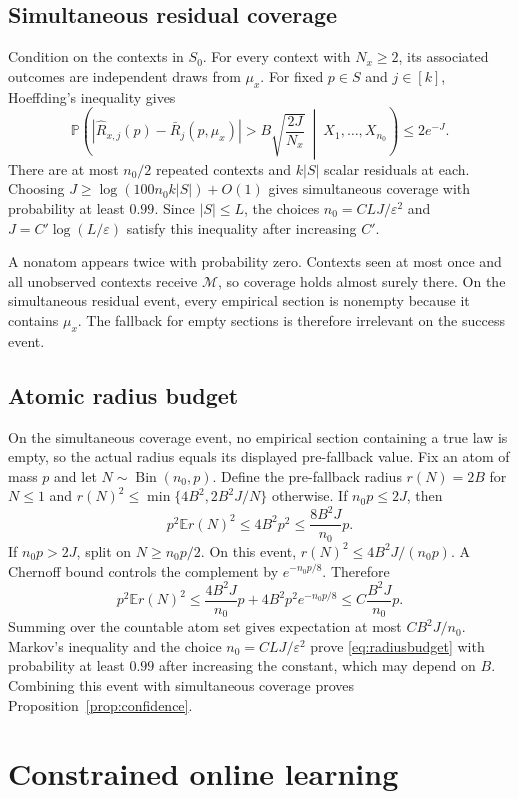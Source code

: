 \documentclass{article}
\theoremstyle{definition}
\theoremstyle{remark}
\newcommand{\E}{\mathbb E}
\newcommand{\Prb}{\mathbb P}
\newcommand{\1}{\mathbf 1}
\newcommand{\cM}{\mathcal M}
\begin{document}
\subsection{Simultaneous residual coverage}

Condition on the contexts in $S_0$. For every context with $N_x\ge2$, its associated outcomes are independent draws from $\mu_x$. For fixed $p\in S$ and $j\in[k]$, Hoeffding's inequality gives \[ \Prb\!\left(\left|\widehat R_{x,j}(p)-\bar R_j(p,\mu_x)\right|>B\sqrt{\frac{2J}{N_x}}\ \middle|\ X_1,\ldots,X_{n_0}\right)\le2e^{-J}. \] There are at most $n_0/2$ repeated contexts and $k|S|$ scalar residuals at each. Choosing $J\ge\log(100n_0k|S|)+O(1)$ gives simultaneous coverage with probability at least $0.99$. Since $|S|\le L$, the choices $n_0=CLJ/\varepsilon^2$ and $J=C'\log(L/\varepsilon)$ satisfy this inequality after increasing $C'$.

A nonatom appears twice with probability zero. Contexts seen at most once and all unobserved contexts receive $\cM$, so coverage holds almost surely there. On the simultaneous residual event, every empirical section is nonempty because it contains $\mu_x$. The fallback for empty sections is therefore irrelevant on the success event.

\subsection{Atomic radius budget}

On the simultaneous coverage event, no empirical section containing a true law is empty, so the actual radius equals its displayed pre-fallback value. Fix an atom of mass $p$ and let $N\sim\operatorname{Bin}(n_0,p)$. Define the pre-fallback radius $r(N)=2B$ for $N\le1$ and $r(N)^2\le\min\{4B^2,2B^2J/N\}$ otherwise. If $n_0p\le2J$, then \[ p^2\E r(N)^2\le4B^2p^2\le\frac{8B^2J}{n_0}p. \] If $n_0p>2J$, split on $N\ge n_0p/2$. On this event, $r(N)^2\le4B^2J/(n_0p)$. A Chernoff bound controls the complement by $e^{-n_0p/8}$. Therefore \[ p^2\E r(N)^2 \le \frac{4B^2J}{n_0}p+4B^2p^2e^{-n_0p/8} \le C\frac{B^2J}{n_0}p. \] Summing over the countable atom set gives expectation at most $CB^2J/n_0$. Markov's inequality and the choice $n_0=CLJ/\varepsilon^2$ prove \eqref{eq:radiusbudget} with probability at least $0.99$ after increasing the constant, which may depend on $B$. Combining this event with simultaneous coverage proves Proposition~\ref{prop:confidence}.

\section{Constrained online learning}\label{app:online}
\end{document}
